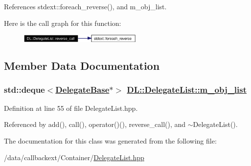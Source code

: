 References stdext::foreach\_\-reverse(), and m\_\-obj\_\-list.

Here is the call graph for this function:\begin{figure}[H]
\begin{center}
\leavevmode
\includegraphics[width=172pt]{classDL_1_1DelegateList_a2_cgraph}
\end{center}
\end{figure}


\subsection{Member Data Documentation}
\hypertarget{classDL_1_1DelegateList_r0}{
\subsubsection[m\_\-obj\_\-list]{\setlength{\rightskip}{0pt plus 5cm}std::deque$<$\hyperlink{classDL_1_1DelegateBase}{Delegate\-Base}$\ast$$>$ \hyperlink{classDL_1_1DelegateList_r0}{DL::Delegate\-List::m\_\-obj\_\-list}}}
\label{classDL_1_1DelegateList_r0}




Definition at line 55 of file Delegate\-List.hpp.

Referenced by add(), call(), operator()(), reverse\_\-call(), and $\sim$Delegate\-List().

The documentation for this class was generated from the following file:\begin{CompactItemize}
\item 
/data/callbackext/Container/\hyperlink{DelegateList_8hpp}{Delegate\-List.hpp}\end{CompactItemize}
